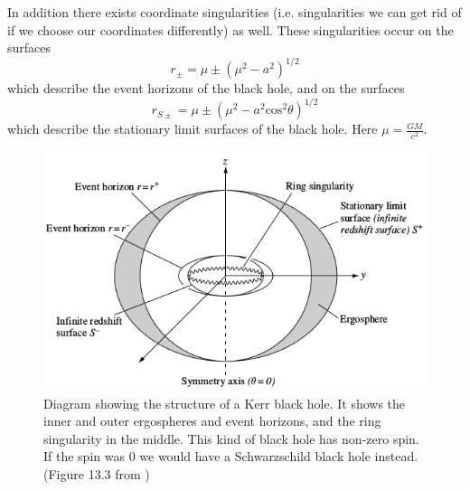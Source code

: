 \documentclass[english, oneside]{HYgradu}
\begin{document}
In addition there exists coordinate singularities (i.e. singularities we can get rid of if we choose our coordinates differently) as well. These singularities occur on the surfaces
\begin{equation}
r_\pm = \mu \pm (\mu^2 - a^2)^{1/2}
\end{equation}
which describe the event horizons of the black hole, and on the surfaces
\begin{equation}
r_{S \pm} = \mu \pm (\mu^2 - a^2 \mathrm{cos}^2 \theta)^{1/2}
\end{equation}
which describe the stationary limit surfaces of the black hole. Here $\mu = \frac{GM}{c^2}$. 

\begin{figure}[h!tb]
\centering
\includegraphics[width=\textwidth]{../images/kerrhole.png}
\caption{Diagram showing the structure of a Kerr black hole. It shows the inner and outer ergospheres and event horizons, and the ring singularity in the middle. This kind of black hole has non-zero spin. If the spin was 0 we would have a Schwarzschild black hole instead.
(Figure 13.3 from \cite{grintro})}
\label{fig:KerrHole}
\end{figure}





\end{document}
